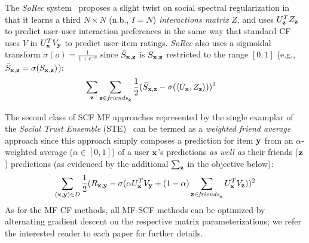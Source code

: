 The {\it SoRec} system~\cite{sorec} proposes a slight twist on social
spectral regularization in that it learns a third $N \times N$ (n.b., $I = N$)
\emph{interactions matrix} $Z$, and uses $U_{\mathbf{z}}^T Z_{\mathbf{z}}$ to predict user-user
interaction preferences in the same way that standard CF uses $V$ in
$U_{\mathbf{x}}^T V_{\mathbf{y}}$ to predict user-item ratings.  {\it SoRec} also uses a
sigmoidal transform $\sigma(o) = \frac{1}{1 + e^{-o}}$ since $\bar{S}_{\mathbf{x},\mathbf{z}}$
is $S_{\mathbf{x},\mathbf{z}}$ restricted to the range $[0,1]$ 
(e.g., $\bar{S}_{\mathbf{x},\mathbf{z}} = \sigma(S_{\mathbf{x},\mathbf{z}})$):
%
%
\begin{align}
\sum_{\mathbf{z}} & \sum_{\mathbf{z} \in \mathit{friends}_{\mathbf{x}}} \frac{1}{2} (\bar{S}_{\mathbf{x},\mathbf{z}} - \sigma(\langle U_{\mathbf{x}}, Z_{\mathbf{z}} \rangle))^2 
\end{align}

The second class of SCF MF approaches represented by the single
examplar of the {\it Social Trust Ensemble} (STE)~\cite{ste} can be termed as a
\emph{weighted friend average} approach since this approach simply composes a
prediction for item $\mathbf{y}$ from an $\alpha$-weighted average ($\alpha
\in [0,1]$) of a user $\mathbf{x}$'s predictions \emph{as well as} their friends
($\mathbf{z}$) predictions (as evidenced by the additional $\sum_{\mathbf{z}}$ in the
objective below):
\begin{align}
\sum_{(\mathbf{x},\mathbf{y}) \in D} \frac{1}{2} (R_{\mathbf{x},\mathbf{y}} - \sigma (\alpha U_{\mathbf{x}}^T V_{\mathbf{y}} + (1 - \alpha) \sum_{\mathbf{z} \in \mathit{friends}_{\mathbf{x}}} U_{\mathbf{x}}^T V_{\mathbf{z}}))^2 
\end{align}
As for the MF CF methods, all MF SCF methods can be optimized by alternating
gradient descent on the respective matrix parameterizations; we refer
the interested reader to each paper for further details.


